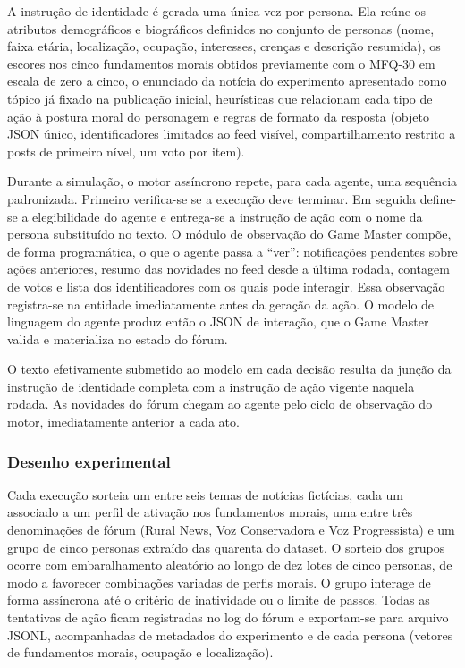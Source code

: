 A instrução de identidade é gerada uma única vez por persona. Ela reúne os atributos demográficos e biográficos definidos no conjunto de personas (nome, faixa etária, localização, ocupação, interesses, crenças e descrição resumida), os escores nos cinco fundamentos morais obtidos previamente com o MFQ-30 em escala de zero a cinco, o enunciado da notícia do experimento apresentado como tópico já fixado na publicação inicial, heurísticas que relacionam cada tipo de ação à postura moral do personagem e regras de formato da resposta (objeto JSON único, identificadores limitados ao feed visível, compartilhamento restrito a posts de primeiro nível, um voto por item).

Durante a simulação, o motor assíncrono repete, para cada agente, uma sequência padronizada. Primeiro verifica-se se a execução deve terminar. Em seguida define-se a elegibilidade do agente e entrega-se a instrução de ação com o nome da persona substituído no texto. O módulo de observação do Game Master compõe, de forma programática, o que o agente passa a “ver”: notificações pendentes sobre ações anteriores, resumo das novidades no feed desde a última rodada, contagem de votos e lista dos identificadores com os quais pode interagir. Essa observação registra-se na entidade imediatamente antes da geração da ação. O modelo de linguagem do agente produz então o JSON de interação, que o Game Master valida e materializa no estado do fórum.

O texto efetivamente submetido ao modelo em cada decisão resulta da junção da instrução de identidade completa com a instrução de ação vigente naquela rodada. As novidades do fórum chegam ao agente pelo ciclo de observação do motor, imediatamente anterior a cada ato.

\subsubsection{Desenho experimental}
\label{sec:desenho-experimental}

Cada execução sorteia um entre seis temas de notícias fictícias, cada um associado a um perfil de ativação nos fundamentos morais, uma entre três denominações de fórum (Rural News, Voz Conservadora e Voz Progressista) e um grupo de cinco personas extraído das quarenta do dataset. O sorteio dos grupos ocorre com embaralhamento aleatório ao longo de dez lotes de cinco personas, de modo a favorecer combinações variadas de perfis morais. O grupo interage de forma assíncrona até o critério de inatividade ou o limite de passos. Todas as tentativas de ação ficam registradas no log do fórum e exportam-se para arquivo JSONL, acompanhadas de metadados do experimento e de cada persona (vetores de fundamentos morais, ocupação e localização).
